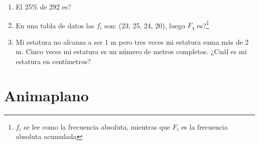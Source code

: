 \documentclass[letterpaper,11pt,twoside]{article}
\begin{document}
\begin{multicols}{2}
\begin{enumerate}
\begin{center}
\end{center}
\item El 25\% de 292 es?
\item En una tabla de datos las $f_{i}$ son: (23, 25, 24, 20), luego $F_{4}$ es?\footnote{$f_{i}$ se lee como la frecuencia absoluta, mientras que $F_{i}$ es la frecuencia absoluta acumulada}
\item Mi estatura no alcanza a ser 1 m pero tres veces mi estatura suma más de 2 m. Cinco veces mi estatura es un número de metros completos. ¿Cuál es mi estatura en centímetros?
\end{enumerate}
\end{multicols}
\section*{Animaplano}
\begin{center}

\end{center}
\end{document}
